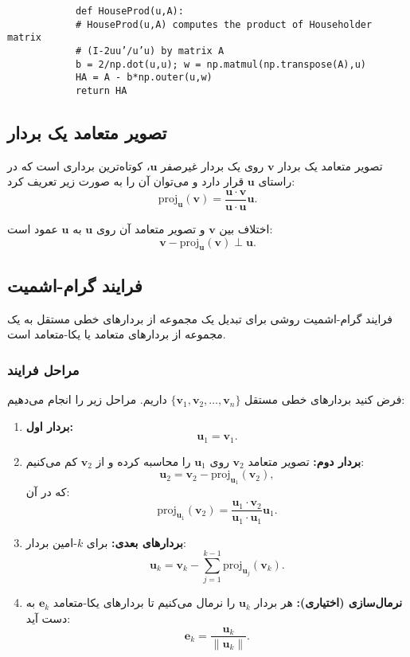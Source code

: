 \begin{code}
	\begin{latin}
		\begin{lstlisting}
			def HouseProd(u,A):
			# HouseProd(u,A) computes the product of Householder matrix
			# (I-2uu’/u’u) by matrix A
			b = 2/np.dot(u,u); w = np.matmul(np.transpose(A),u)
			HA = A - b*np.outer(u,w)
			return HA
		\end{lstlisting}
	\end{latin}
\end{code}

\subsection{تصویر متعامد یک بردار}
تصویر متعامد یک بردار \( \mathbf{v} \) روی یک بردار غیرصفر \( \mathbf{u} \)، کوتاه‌ترین برداری است که در راستای \( \mathbf{u} \) قرار دارد و می‌توان آن را به صورت زیر تعریف کرد:
\[
\text{proj}_{\mathbf{u}}(\mathbf{v}) = \frac{\mathbf{u} \cdot \mathbf{v}}{\mathbf{u} \cdot \mathbf{u}} \mathbf{u}.
\]

اختلاف بین \( \mathbf{v} \) و تصویر متعامد آن روی \( \mathbf{u} \) به \( \mathbf{u} \) عمود است:
\[
\mathbf{v} - \text{proj}_{\mathbf{u}}(\mathbf{v}) \perp \mathbf{u}.
\]

\subsection{فرایند گرام-اشمیت}
فرایند گرام-اشمیت روشی برای تبدیل یک مجموعه از بردارهای خطی مستقل به یک مجموعه از بردارهای متعامد یا یکا-متعامد است. 

\subsubsection{مراحل فرایند}
فرض کنید بردارهای خطی مستقل \( \{\mathbf{v}_1, \mathbf{v}_2, \ldots, \mathbf{v}_n\} \) داریم. مراحل زیر را انجام می‌دهیم:

\begin{enumerate}
	\item \textbf{بردار اول:} 
	\[
	\mathbf{u}_1 = \mathbf{v}_1.
	\]
	
	\item \textbf{بردار دوم:} 
	تصویر متعامد \( \mathbf{v}_2 \) روی \( \mathbf{u}_1 \) را محاسبه کرده و از \( \mathbf{v}_2 \) کم می‌کنیم:
	\[
	\mathbf{u}_2 = \mathbf{v}_2 - \text{proj}_{\mathbf{u}_1}(\mathbf{v}_2),
	\]
	که در آن:
	\[
	\text{proj}_{\mathbf{u}_1}(\mathbf{v}_2) = \frac{\mathbf{u}_1 \cdot \mathbf{v}_2}{\mathbf{u}_1 \cdot \mathbf{u}_1} \mathbf{u}_1.
	\]
	
	\item \textbf{بردارهای بعدی:} 
	برای \( k \)-امین بردار:
	\[
	\mathbf{u}_k = \mathbf{v}_k - \sum_{j=1}^{k-1} \text{proj}_{\mathbf{u}_j}(\mathbf{v}_k).
	\]
	
	\item \textbf{نرمال‌سازی (اختیاری):} 
	هر بردار \( \mathbf{u}_k \) را نرمال می‌کنیم تا بردارهای یکا-متعامد \( \mathbf{e}_k \) به دست آید:
	\[
	\mathbf{e}_k = \frac{\mathbf{u}_k}{\|\mathbf{u}_k\|}.
	\]
\end{enumerate}

